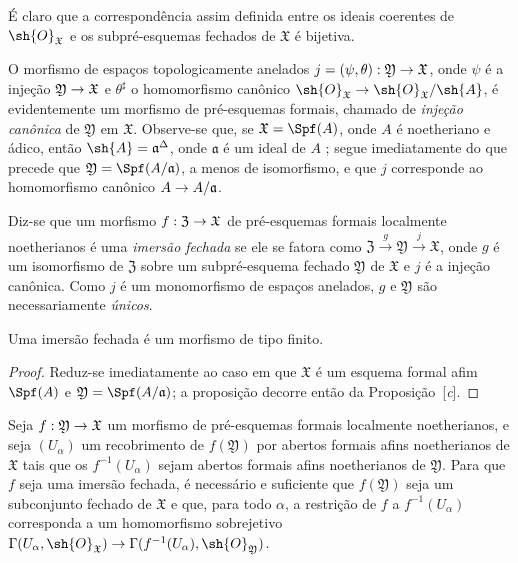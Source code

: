 \documentclass[oneside]{amsart}
\makeatletter
\newcommand{\ega@arrow}[2]{\mathchoice{#1}{#2}{#2}{#2}}
\renewcommand{\to}{\ega@arrow{\longrightarrow}{\rightarrow}}
\let\EGAOriginalLabel\label
\renewcommand{\label}[1]{\phantomsection\EGAOriginalLabel{#1}}
\newcommand*{\ega@errmark}[1]{\textbf{Err}\textsubscript{#1}}
\newcommand{\erratum}[2][]{{#2}\marginpar{\footnotesize\ega@errmark{#1}}}
\makeatother
\begin{document}
É claro que a correspondência assim definida entre os \erratum[II]{ideais coerentes de $\sh{O}_\mathfrak{X}$} e os subpré-esquemas fechados de $\mathfrak{X}$ é bijetiva.

O morfismo de espaços topologicamente anelados $j=(\psi,\theta):\mathfrak{Y}\to\mathfrak{X}$, onde $\psi$ é a injeção $\mathfrak{Y}\to\mathfrak{X}$ e $\theta^\sharp$ o homomorfismo canônico $\sh{O}_\mathfrak{X}\to\sh{O}_\mathfrak{X}/\sh{A}$, é evidentemente  um morfismo de pré-esquemas formais, chamado de \emph{injeção canônica} de $\mathfrak{Y}$ em $\mathfrak{X}$.
Observe-se que, se $\mathfrak{X}=\Spf(A)$, onde $A$ é noetheriano e ádico, então $\sh{A}=\mathfrak{a}^\Delta$, onde $\mathfrak{a}$ é um ideal de $A$ ; segue imediatamente do que precede que $\mathfrak{Y}=\Spf(A/\mathfrak{a})$, a menos de isomorfismo, e que $j$ corresponde  ao homomorfismo canônico $A\to A/\mathfrak{a}$.

Diz-se que um morfismo $f:\mathfrak{Z}\to\mathfrak{X}$ de pré-esquemas formais localmente noetherianos é uma \emph{imersão fechada} se ele se fatora como $\mathfrak{Z}\xrightarrow{g}\mathfrak{Y}\xrightarrow{j}\mathfrak{X}$, onde $g$ é um isomorfismo de $\mathfrak{Z}$ sobre um subpré-esquema fechado $\mathfrak{Y}$ de $\mathfrak{X}$ e $j$ é a injeção canônica.
Como $j$ é um monomorfismo de espaços anelados, $g$ e $\mathfrak{Y}$ são necessariamente \emph{únicos}.

\begin{proposition}[10.14.3]
\label{I.10.14.3}
Uma imersão fechada é um morfismo de tipo finito.
\end{proposition}

\begin{proof}
Reduz-se imediatamente ao caso em que $\mathfrak{X}$ é um esquema formal afim $\Spf(A)$ e $\mathfrak{Y}=\Spf(A/\mathfrak{a})$;
a proposição decorre então da Proposição~[\emph{c}].
\end{proof}

\begin{lemma}[10.14.4]
\label{I.10.14.4}
Seja $f:\mathfrak{Y}\to\mathfrak{X}$ um morfismo de pré-esquemas formais localmente noetherianos, e seja $(U_\alpha)$ um recobrimento de $f(\mathfrak{Y})$ por abertos formais afins noetherianos de $\mathfrak{X}$ tais que os $f^{-1}(U_\alpha)$ sejam abertos formais afins noetherianos de $\mathfrak{Y}$.
Para que $f$ seja uma imersão fechada, é necessário e suficiente que $f(\mathfrak{Y})$ seja um subconjunto fechado de $\mathfrak{X}$ e que, para todo $\alpha$, a restrição de $f$ a $f^{-1}(U_\alpha)$ corresponda  a um homomorfismo sobrejetivo $\Gamma(U_\alpha,\sh{O}_\mathfrak{X})\to\Gamma(f^{-1}(U_\alpha),\sh{O}_\mathfrak{Y})$.
\end{lemma}
\end{document}
